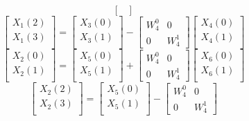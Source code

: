 \documentclass[journal,12pt,twocolumn]{IEEEtran}
\renewcommand\thesection{\arabic{section}}
\begin{document}
\begin{enumerate}[label=\arabic*.,ref=\thesection.\theenumi]
\begin{equation}
\begin{bmatrix}
\end{bmatrix}
\end{equation}
\begin{equation}
\begin{bmatrix}
X_{1}(2) \\ 
X_{1}(3)\\ 
\end{bmatrix}
=
\begin{bmatrix}
X_{3}(0) \\ 
X_{3}(1)\\ 
\end{bmatrix}
-
\begin{bmatrix}
W^{0}_{4} & 0\\
0 & W^{1}_{4}
\end{bmatrix}
\begin{bmatrix}
X_{4}(0) \\ 
X_{4}(1) \\ 
\end{bmatrix}
\end{equation}
\begin{equation}
\begin{bmatrix}
X_{2}(0) \\ 
X_{2}(1)\\ 
\end{bmatrix}
=
\begin{bmatrix}
X_{5}(0) \\ 
X_{5}(1)\\ 
\end{bmatrix}
+
\begin{bmatrix}
W^{0}_{4} & 0\\
0 & W^{1}_{4}
\end{bmatrix}
\begin{bmatrix}
X_{6}(0) \\ 
X_{6}(1) \\ 
\end{bmatrix}
\end{equation}
\begin{equation}
\begin{bmatrix}
X_{2}(2) \\ 
X_{2}(3)\\ 
\end{bmatrix}
=
\begin{bmatrix}
X_{5}(0) \\ 
X_{5}(1)\\ 
\end{bmatrix}
-
\begin{bmatrix}
W^{0}_{4} & 0\\
0 & W^{1}_{4}

\end{bmatrix}
\end{equation}
\end{enumerate}
\end{document}
